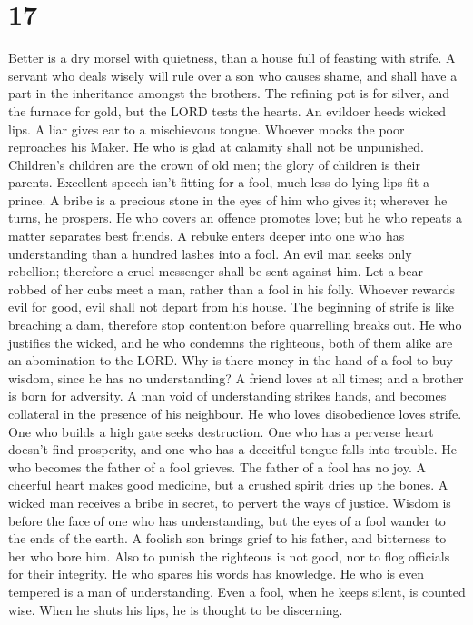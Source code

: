 \hypertarget{section-16}{%
\section{17}\label{section-16}}

 Better is a dry morsel with quietness, than a house full
of feasting with strife.  A servant who deals wisely will
rule over a son who causes shame, and shall have a part in the
inheritance amongst the brothers.  The refining pot is for
silver, and the furnace for gold, but the LORD tests the hearts.
 An evildoer heeds wicked lips. A liar gives ear to a
mischievous tongue.  Whoever mocks the poor reproaches his
Maker. He who is glad at calamity shall not be unpunished.
 Children's children are the crown of old men; the glory
of children is their parents.  Excellent speech isn't
fitting for a fool, much less do lying lips fit a prince. 
A bribe is a precious stone in the eyes of him who gives it; wherever he
turns, he prospers.  He who covers an offence promotes
love; but he who repeats a matter separates best friends.
 A rebuke enters deeper into one who has understanding
than a hundred lashes into a fool.  An evil man seeks
only rebellion; therefore a cruel messenger shall be sent against him.
 Let a bear robbed of her cubs meet a man, rather than a
fool in his folly.  Whoever rewards evil for good, evil
shall not depart from his house.  The beginning of strife
is like breaching a dam, therefore stop contention before quarrelling
breaks out.  He who justifies the wicked, and he who
condemns the righteous, both of them alike are an abomination to the
LORD.  Why is there money in the hand of a fool to buy
wisdom, since he has no understanding?  A friend loves at
all times; and a brother is born for adversity.  A man
void of understanding strikes hands, and becomes collateral in the
presence of his neighbour.  He who loves disobedience
loves strife. One who builds a high gate seeks destruction.
 One who has a perverse heart doesn't find prosperity,
and one who has a deceitful tongue falls into trouble. 
He who becomes the father of a fool grieves. The father of a fool has no
joy.  A cheerful heart makes good medicine, but a crushed
spirit dries up the bones.  A wicked man receives a bribe
in secret, to pervert the ways of justice.  Wisdom is
before the face of one who has understanding, but the eyes of a fool
wander to the ends of the earth.  A foolish son brings
grief to his father, and bitterness to her who bore him. 
Also to punish the righteous is not good, nor to flog officials for
their integrity.  He who spares his words has knowledge.
He who is even tempered is a man of understanding.  Even
a fool, when he keeps silent, is counted wise. When he shuts his lips,
he is thought to be discerning.


